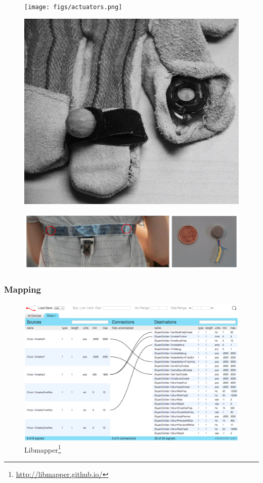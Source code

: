 \documentclass{beamer}
\begin{document}
\begin{frame}[allowframebreaks]
	\begin{figure}
		\texttt{[image: figs/actuators.png]}
	\end{figure}
	\begin{figure}
		\includegraphics[scale=.39]{figs/ccloseups.png}
		\caption{\citep{knutzen2013,knutzen_vibrotactile_2014}}
	\end{figure}
	\begin{figure}
		\includegraphics[scale=.2]{figs/giordanoact.png}
		\caption{\citep{schumacher_vibrotactile_2013}}
	\end{figure}
\end{frame}

\begin{frame}
	\frametitle{Mapping}
	\begin{figure}
		\includegraphics[scale=.25]{figs/webmapper.png}
		\caption{Libmapper\footnote{\url{http://libmapper.github.io/}}}
	\end{figure}
\end{frame}
\end{document}
